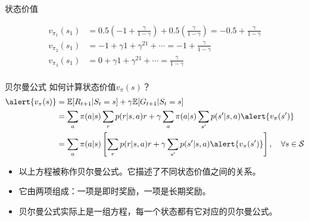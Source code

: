 \begin{frame}{状态价值}
\begin{center}
    \end{center}
    \[
        \begin{aligned}
            v_{\pi_1}(s_1)&=0.5\left(-1+\frac{\gamma}{1-\gamma}\right)+0.5\left(\frac{\gamma}{1-\gamma}\right) = -0.5+\frac{\gamma}{1-\gamma}\\
            v_{\pi_2}(s_1)&=-1+\gamma1+\gamma^21+\cdots=-1+\frac{\gamma}{1-\gamma}\\
            v_{\pi_3}(s_1)&=0+\gamma1+\gamma^21+\cdots=\frac{\gamma}{1-\gamma} \\            
        \end{aligned}
    \]
\end{frame}

\begin{frame}{贝尔曼公式}
    如何计算状态价值$v_{\pi}(s)$？
    \[
        \begin{aligned}
            \alert{v_\pi(s)}&=\mathbb{E}[R_{t+1}|S_t=s]+\gamma\mathbb{E}[G_{t+1}|S_t=s] \\
            &=\sum_a\pi(a|s)\sum_r p(r|s,a)r+\gamma\sum_a\pi(a|s)\sum_{s'}p(s'|s,a)\alert{v_{\pi}(s')} \\
            &=\sum_a\pi(a|s)\left[\sum_r p(r|s,a)r+\gamma\sum_{s'}p(s'|s,a)\alert{v_{\pi}(s')}\right], \quad \forall s\in\mathcal{S}
        \end{aligned}
    \]
    \begin{itemize}
        \item 以上方程被称作贝尔曼公式。它描述了不同状态价值之间的关系。
        \item 它由两项组成：一项是即时奖励，一项是长期奖励。
        \item 贝尔曼公式实际上是一组方程，每一个状态都有它对应的贝尔曼公式。
    \end{itemize}
\end{frame}


